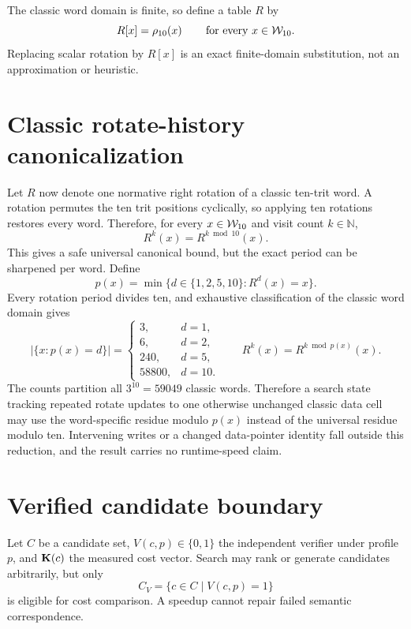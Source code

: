 \documentclass{article}
\begin{document}
The classic word domain is finite, so define a table $R$ by
\begin{equation}
  R[x]=\rho_{10}\!\left(x\right)
  \qquad\text{for every }x\in\mathcal{W}_{10}.
  \label{eq:optimization-rotate-table}
\end{equation}
Replacing scalar rotation by $R[x]$ is an exact finite-domain substitution, not
an approximation or heuristic.

\section{Classic rotate-history canonicalization}

Let $R$ now denote one normative right rotation of a classic ten-trit word. A
rotation permutes the ten trit positions cyclically, so applying ten rotations
restores every word. Therefore, for every $x\in\mathcal{W}_{10}$ and visit count
$k\in\mathbb{N}$,
\begin{equation}
  R^k(x)=R^{k\bmod 10}(x).
  \label{eq:optimization-rotate-history}
\end{equation}
This gives a safe universal canonical bound, but the exact period can be
sharpened per word. Define
\[
  p(x)=\min\{d\in\{1,2,5,10\}:R^d(x)=x\}.
\]
Every rotation period divides ten, and exhaustive classification of the classic
word domain gives
\begin{equation}
  \left|\{x:p(x)=d\}\right|=
  \begin{cases}
    3, & d=1,\\
    6, & d=2,\\
    240, & d=5,\\
    58800, & d=10.
  \end{cases}
  \qquad
  R^k(x)=R^{k\bmod p(x)}(x).
  \label{eq:optimization-rotate-minimal-period}
\end{equation}
The counts partition all $3^{10}=59049$ classic words. Therefore a search state
tracking repeated rotate updates to one otherwise unchanged classic data cell
may use the word-specific residue modulo $p(x)$ instead of the universal residue
modulo ten. Intervening writes or a changed data-pointer identity fall outside
this reduction, and the result carries no runtime-speed claim.

\section{Verified candidate boundary}

Let $C$ be a candidate set, $V(c,p)\in\{0,1\}$ the independent verifier under
profile $p$, and $\mathbf{K}\!\left(c\right)$ the measured cost vector. Search may rank or
generate candidates arbitrarily, but only
\[
  C_V=\{c\in C\mid V(c,p)=1\}
\]
is eligible for cost comparison. A speedup cannot repair failed semantic
correspondence.
\end{document}
